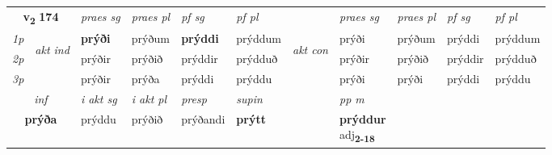 \noindent
\begin{tabular}{lllllllllll} \toprule
\multicolumn{2}{c}{\textbf{v{\textsubscript{2}}} \Large{\textbf{174}}}  &  \textit{praes sg}  & \textit{praes pl}  &\textit{ pf sg} & \textit{pf pl} &  &  \textit{praes sg}  & \textit{praes pl}  & \textit{pf sg} & \textit{pf pl } \\*
	\cmidrule{3-6} \cmidrule{8-11}
 {\textit{1p}} & \multirow{3}{*}{\begin{turn}{90}\textit{akt ind}\end{turn}} & \textbf{prýði} & prýðum & \textbf{prýddi} & prýddum & \multirow{3}{*}{\begin{turn}{90}\textit{akt con}\end{turn}} &prýði & prýðum & prýddi & prýddum\\*
 {\textit{2p}} &  &  prýðir  & prýðið & prýddir & prýdduð & & prýðir & prýðið & prýddir & prýdduð \\*
{\textit{3p}} &  & prýðir & prýða & prýddi & prýddu & & prýði & prýði& prýddi & prýddu \\*
\cmidrule{3-6} \cmidrule{8-11}

   \multicolumn{2}{c}{\textit{inf}}  & \textit{i akt sg} & \textit{i akt pl}   & \textit{presp} & \textit{supin}  && \textit{pp m} \\*
  \multicolumn{2}{c}{\textbf{prýða}} & prýddu  & prýðið   & prýðandi &  \textbf{prýtt}  && \specialcell{\textbf{prýddur} \\ adj\textbf{\textsubscript{2-18}}} \\*
\end{tabular}

